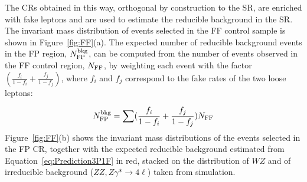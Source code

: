 The CRs obtained in this way, orthogonal by construction
to the SR, are enriched with fake leptons and are used to
estimate the reducible background in the SR. 
The invariant mass distribution of events selected in the FF control sample
is shown in Figure~\ref{fig:FF}(a). 
The expected number of reducible background events in the FP region,
$N^{\rm bkg}_{\rm FP}$, can be computed from the number of events
observed in the FF control region, $N_{\rm FF}$, by weighting each
event with the factor $(\frac{f_{i}}{1-f_{i}}
+ \frac{f_{j}}{1-f_{j}})$, where $f_{i}$ and $f_{j}$ correspond to the
fake rates of the two loose leptons:

\begin{equation} 
\label{eq:Prediction3P1F}
N^{\rm bkg}_{\rm FP} = \sum (\frac{f_{i}}{1-f_{i}}
+ \frac{f_{j}}{1-f_{j}}) N_{\rm FF}
\end{equation} 
Figure~\ref{fig:FF}(b) shows the invariant mass distributions of the
events selected in the FP CR, together with the expected
reducible background estimated from Equation~\ref{eq:Prediction3P1F} in red,
stacked on the distribution
of $WZ$ and of irreducible background ($ZZ, Z\gamma* \to 4\ell$) taken from simulation.

